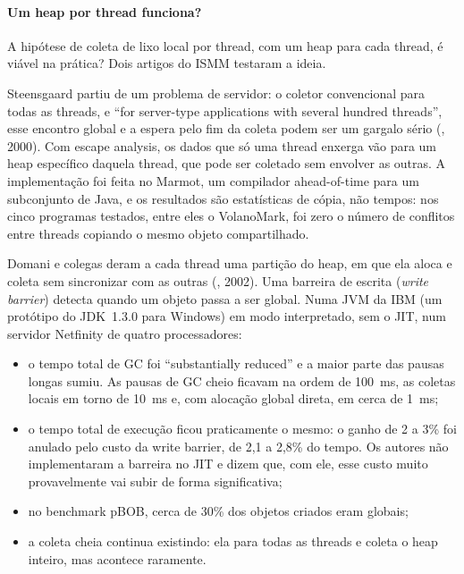 \paragraph{Um heap por thread funciona?}
A hipótese de coleta de lixo local por thread, com um heap para cada
thread, é viável na prática? Dois artigos do ISMM testaram a ideia.

Steensgaard partiu de um problema de servidor: o coletor convencional
para todas as threads, e \enquote{for server-type applications with
several hundred threads}, esse encontro global e a espera pelo fim da
coleta podem ser um gargalo sério (,
2000). Com escape analysis, os dados que só uma thread enxerga vão para
um heap específico daquela thread, que pode ser coletado sem envolver as
outras. A implementação foi feita no Marmot, um compilador
ahead-of-time para um subconjunto de Java, e os resultados são
estatísticas de cópia, não tempos: nos cinco programas testados, entre
eles o VolanoMark, foi zero o número de conflitos entre threads copiando
o mesmo objeto compartilhado.

Domani e colegas deram a cada thread uma partição do heap, em que ela
aloca e coleta sem sincronizar com as outras
(, 2002). Uma barreira de escrita
(\emph{write barrier}) detecta
quando um objeto passa a ser global. Numa JVM da IBM (um protótipo do
JDK~1.3.0 para Windows) em modo interpretado, sem o JIT, num servidor
Netfinity de quatro processadores:
\begin{itemize}
\item o tempo total de GC foi \enquote{substantially reduced} e a maior
  parte das pausas longas sumiu. As pausas de GC cheio ficavam na ordem de
  100~ms, as coletas locais em torno de 10~ms e, com alocação global
  direta, em cerca de 1~ms;
\item o tempo total de execução ficou praticamente o mesmo: o ganho de
  2 a 3\% foi anulado pelo custo da write barrier, de 2,1 a 2,8\% do
  tempo. Os autores não implementaram a barreira no JIT e dizem que, com
  ele, esse custo muito provavelmente vai subir de forma significativa;
\item no benchmark pBOB, cerca de 30\% dos objetos criados eram globais;
\item a coleta cheia continua existindo: ela para todas as threads e
  coleta o heap inteiro, mas acontece raramente.
\end{itemize}

